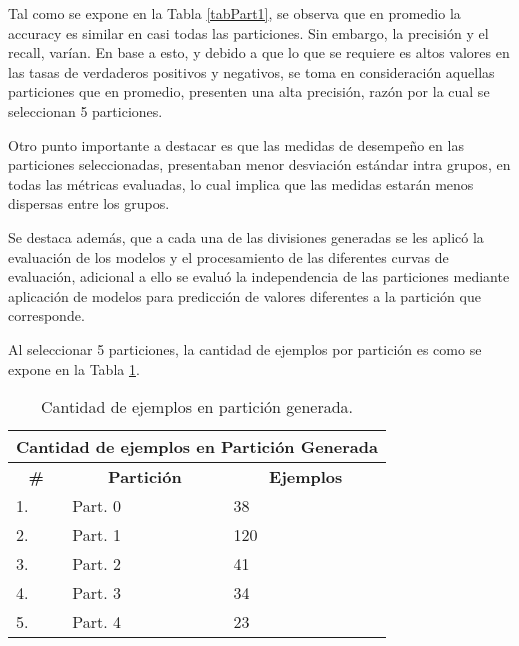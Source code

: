\begin{center}
\end{center}

Tal como se expone en la Tabla \ref{tabPart1}, se observa que en promedio la accuracy es similar en casi todas las particiones. Sin embargo, la precisi\'on y el recall, var\'ian. En base a esto, y debido a que lo que se requiere es altos valores en las tasas de verdaderos positivos y negativos, se toma en consideraci\'on aquellas particiones que en promedio, presenten una alta precisi\'on, raz\'on por la cual se seleccionan 5 particiones.

Otro punto importante a destacar es que las medidas de desempe\~no en las particiones seleccionadas, presentaban menor desviaci\'on est\'andar intra grupos, en todas las m\'etricas evaluadas, lo cual implica que las medidas estar\'an menos dispersas entre los grupos.

Se destaca adem\'as, que a cada una de las divisiones generadas se les aplic\'o la evaluaci\'on de los modelos y el procesamiento de las diferentes curvas de evaluaci\'on, adicional a ello se evalu\'o la independencia de las particiones mediante aplicaci\'on de modelos para predicci\'on de valores diferentes a la partici\'on que corresponde.

Al seleccionar 5 particiones, la cantidad de ejemplos por partici\'on es como se expone en la Tabla \ref{tabPart2}.

	\begin{table}[!h]
		\centering
		\begin{tabular}{|l|l|l|}
			\hline
			\multicolumn{3}{|c|}{\textbf{Cantidad de ejemplos en Partici\'on Generada}}                                                       \\ \hline
			\multicolumn{1}{|c|}{\textbf{\#}} & \multicolumn{1}{c|}{\textbf{Partici\'on}} & \multicolumn{1}{c|}{\textbf{Ejemplos}} \\ \hline
			1.                                & Part. 0                                & 38                                    \\ \hline
			2.                                & Part. 1                                & 120                                     \\ \hline
			3.                                & Part. 2                                & 41                                     \\ \hline
			4.                                & Part. 3                                & 34                                     \\ \hline
			5.                                & Part. 4                                & 23                                     \\ \hline
		\end{tabular}
		\caption{Cantidad de ejemplos en partici\'on generada.}
		\label{tabPart2}
	\end{table}

